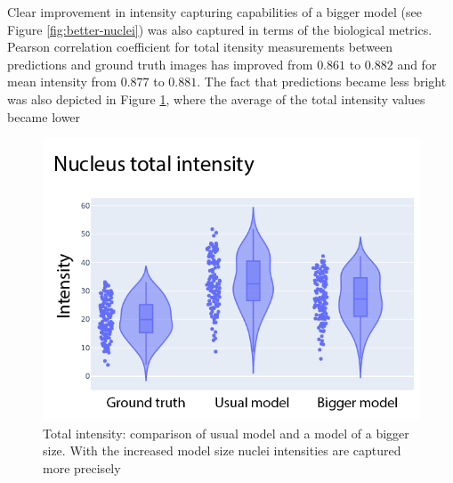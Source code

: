 Clear improvement in intensity capturing capabilities of a bigger model (see Figure \ref{fig:better-nuclei}) was also captured in terms of the biological metrics. Pearson correlation coefficient for total itensity measurements between predictions and ground truth images has improved from $0.861$ to $0.882$ and for mean intensity from $0.877$ to $0.881$. The fact that predictions became less bright was also depicted in Figure \ref{fig:nuclei-bigger-smaller-total-intensity}, where the average of the total intensity values became lower


\begin{figure}[htb]
	\begin{center}
		\includegraphics[width=0.4\linewidth]{bilder/nuclei/metric/bigger-smaller-comparison.png}
		\caption[Total intensity: comparison of usual model and a model of a bigger size]%
        {Total intensity: comparison of usual model and a model of a bigger size. With the increased model size nuclei intensities are captured more precisely}\label{fig:nuclei-bigger-smaller-total-intensity}
	\end{center}
\end{figure}